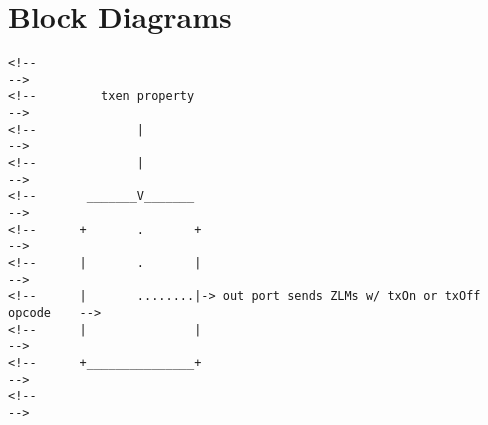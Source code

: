\documentclass{article}
\begin{document}
\section*{Block Diagrams}
\begin{flushleft}
\begin{verbatim}
<!--                                                                         -->
<!--         txen property                                                   -->
<!--              |                                                          -->
<!--              |                                                          -->
<!--       _______V_______                                                   -->
<!--      +       .       +                                                  -->
<!--      |       .       |                                                  -->
<!--      |       ........|-> out port sends ZLMs w/ txOn or txOff opcode    -->
<!--      |               |                                                  -->
<!--      +_______________+                                                  -->
<!--                                                                         -->
\end{verbatim}
\end{flushleft}
\end{document}
